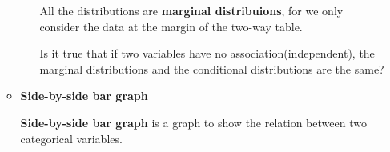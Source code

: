 \documentclass[a4paper, 12pt,twoside]{book}
\begin{document}
\begin{itemize}
\begin{itemize}
\begin{itemize}
All the distributions are \textbf{marginal distribuions}, for we only consider the data at the margin of the two-way table.

\colorbox{dollarbill}{\parbox{13.2cm}{Is it true that if two variables have no association(independent), the marginal distributions and the conditional distributions are the same?}}
\end{itemize}
\vspace{0.6cm}
\item \textbf{Side-by-side bar graph}
\vspace{0.6cm}

\textbf{Side-by-side bar graph} is a graph to show the relation between two categorical variables.


\end{itemize}
\end{itemize}
\end{document}
